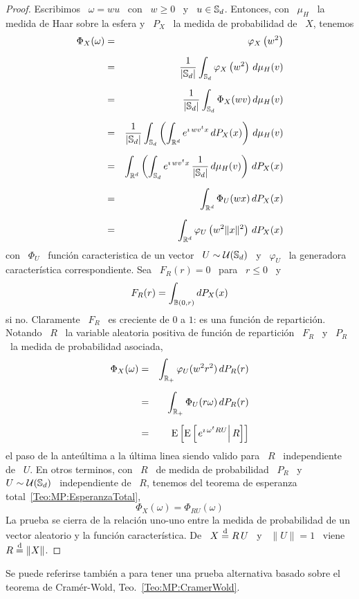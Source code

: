 \begin{proof}
  Escribimos  \ $\omega  = w  u$  \ con  \ $w  \ge  0$ \  y \  $u \in  \mathbb{S}_d$.
  Entonces, con  \ $\mu_H$ \ la  medida de Haar sobre  la esfera y \  $P_X$ \ la
  medida de probabilidad de \ $X$, tenemos
  \begin{eqnarray*}
  \Phi_X(\omega) & = & \varphi_X\left( w^2 \right)\\[2mm]
  & = & \frac{1}{|\mathbb{S}_d|} \int_{\mathbb{S}_d} \varphi_X\left( w^2 \right) \, d\mu_H(v)\\[2mm]
  & = & \frac{1}{|\mathbb{S}_d|} \int_{\mathbb{S}_d} \Phi_X(w v) \, d\mu_H(v)\\[2mm]
  & = & \frac{1}{|\mathbb{S}_d|} \int_{\mathbb{S}_d} \left( \int_{\mathbb{R}^d} e^{\imath \,
  w v^t x} \, dP_X(x) \right) \, d\mu_H(v)\\[2mm]
  & = & \int_{\mathbb{R}^d} \left( \int_{\mathbb{S}_d} e^{\imath \, w v^t x} \,
  \frac{1}{|\mathbb{S}_d|} \, d\mu_H(v) \right) \, dP_X(x)\\[2mm]
  & = & \int_{\mathbb{R}^d} \Phi_U(w x) \, dP_X(x)\\[2mm]
  & = & \int_{\mathbb{R}^d} \varphi_U\left( w^2 \|x\|^2 \right) \, dP_X(x)
  \end{eqnarray*}
  con \ $\Phi_U$ \ funci\'on caracteristica  de un vector \ $U \sim \mathcal{U}(\mathbb{S}_d)$
  \ y  \ $\varphi_U$  \ la generadora  caracter\'istica correspondiente.   Sea \
  $F_R(r) = 0$ \ para \ $r \le 0$ \ y
  \[
  F_R(r) = \int_{\mathbb{B}(0,r)} dP_X(x)
  \]
  si no.  Claramente  \ $F_R$ \ es creciente  de $0$ a $1$: es  una funci\'on de
  repartici\'on. Notando \ $R$ \  la variable aleatoria positiva de funci\'on de
  repartici\'on \ $F_R$ \ y \ $P_R$ \ la medida de probabilidad asociada,
  \begin{eqnarray*}
  \Phi_X(\omega) & = & \int_{\mathbb{R}_+} \varphi_U( w^2 r^2) \, dP_R(r)\\[2mm]
  & = & \int_{\mathbb{R}_+} \Phi_U(r \omega) \, dP_R(r)\\[2mm]
  & = & \operatorname{E}\left[ \operatorname{E}\left[ \left. e^{\imath \, \omega^t R U} \right | R \right] \right]
  \end{eqnarray*}
  el paso  de la ante\'ultima  a la  \'ultima linea siendo  valido para \  $R$ \
  independiente  de  \ $U$.   En  otros  terminos, con  \  $R$  \  de medida  de
  probabilidad \  $P_R$ \  y \ $U  \sim \mathcal{U}(\mathbb{S}_d)$  \ independiente de  \ $R$,
  tenemos del teorema de esperanza total~\ref{Teo:MP:EsperanzaTotal},
  \[
  \Phi_X(\omega) = \Phi_{R U}(\omega)
  \]
  La prueba se  cierra de la relaci\'on uno-uno entre  la medida de probabilidad
  de un vector aleatorio y la funci\'on caracter\'istica. De \ $X \stackrel{\mathrm{d}}{=} R \, U$
  \ y \ $\| U \| = 1$ \ viene \ $R \stackrel{\mathrm{d}}{=} \| X \|$.
\end{proof}
%
Se puede referirse tambi\'en a \cite[Prop.~4.10]{BilBre99} para tener una prueba
alternativa      basado     sobre      el     teorema      de     Cram\'er-Wold,
Teo.~\ref{Teo:MP:CramerWold}.

